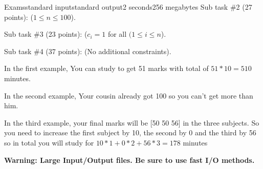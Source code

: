 \begin{problem}{Exams}{standard input}{standard output}{2 seconds}{256 megabytes}
Sub task \#2 (27 points): ($1 \leq n \leq 100$).

Sub task \#3 (23 points): ($c_i = 1$ for all $(1 \le i \le n$).

Sub task \#4 (37 points): (No additional constraints).

\Example

\begin{example}
%
\end{example}

\Note
In the first example, You can study to get 51 marks with total of $51*10 = 510$ minutes.

In the second example, Your cousin already got 100 so you can't get more than him.

In the third example, your final marks will be [50 50 56] in the three subjects. So you need to increase the first subject by 10, the second by 0 and the third by 56 so in total you will study for $10*1+0*2+56*3=178$ minutes

\textbf{Warning: Large Input/Output files. Be sure to use fast I/O methods.}

\end{problem}

